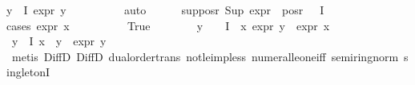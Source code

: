 \begin{isabellebody}
{\isachardoublequoteopen}{\isasymforall}y{\isasymin}{\isasymPhi}\ {\isacharbackquote}{\kern0pt}\ I{\isachardot}{\kern0pt}\ expr{\isacharunderscore}{\kern0pt}{}\ y\ {\isasymle}\ {}{\isachardoublequoteclose}\isanewline
\ \ \ \ \ \ \isamarkupfalse%
\ auto\isanewline
\ \ \ \ \isamarkupfalse%
\ sup{\isacharunderscore}{\kern0pt}pos{\isacharunderscore}{\kern0pt}r{\isacharcolon}{\kern0pt}\ {\isachardoublequoteopen}Sup\ {\isacharparenleft}{\kern0pt}expr{\isacharunderscore}{\kern0pt}{}\ {\isacharbackquote}{\kern0pt}\ {\isacharparenleft}{\kern0pt}pos{\isacharunderscore}{\kern0pt}r\ {\isacharparenleft}{\kern0pt}{\isasymPhi}\ {\isacharbackquote}{\kern0pt}\ I{\isacharparenright}{\kern0pt}{\isacharparenright}{\kern0pt}{\isacharparenright}{\kern0pt}\ {\isasymle}\ {}{\isachardoublequoteclose}\isanewline
\ \ \ \ \isamarkupfalse%
{\isacharparenleft}{\kern0pt}cases\ {\isachardoublequoteopen}expr{\isacharunderscore}{\kern0pt}{}\ x\ {\isasymge}\ {}{\isachardoublequoteclose}{\isacharparenright}{\kern0pt}\isanewline
\ \ \ \ \ \ \isamarkupfalse%
\ True\isanewline
\ \ \ \ \ \ \isamarkupfalse%
\ {\isachardoublequoteopen}{\isasymforall}y\ {\isasymin}\ {\isacharparenleft}{\kern0pt}{\isasymPhi}\ {\isacharbackquote}{\kern0pt}\ I{\isacharparenright}{\kern0pt}\ {\isacharminus}{\kern0pt}\ {\isacharbraceleft}{\kern0pt}x{\isacharbraceright}{\kern0pt}{\isachardot}{\kern0pt}\ expr{\isacharunderscore}{\kern0pt}{}\ y\ {\isacharless}{\kern0pt}\ expr{\isacharunderscore}{\kern0pt}{}\ x{\isachardoublequoteclose}\isanewline
\ \ \ \ \ \ \ \ \isamarkupfalse%
\ {\isacartoucheopen}{\isasymforall}y{\isasymin}{\isasymPhi}\ {\isacharbackquote}{\kern0pt}\ I{\isachardot}{\kern0pt}\ x\ {\isasymnoteq}\ y\ {\isasymlongrightarrow}\ expr{\isacharunderscore}{\kern0pt}{}\ y\ {\isasymle}\ {}{\isacartoucheclose}\isanewline
\ \ \ \ \ \ \ \ \isamarkupfalse%
\ {\isacharparenleft}{\kern0pt}metis\ DiffD{}\ DiffD{}\ dual{\isacharunderscore}{\kern0pt}order{\isachardot}{\kern0pt}trans\ not{\isacharunderscore}{\kern0pt}le{\isacharunderscore}{\kern0pt}imp{\isacharunderscore}{\kern0pt}less\ numeral{\isacharunderscore}{\kern0pt}le{\isacharunderscore}{\kern0pt}one{\isacharunderscore}{\kern0pt}iff\ semiring{\isacharunderscore}{\kern0pt}norm{\isacharparenleft}{\kern0pt}{}{}{\isacharparenright}{\kern0pt}\ singletonI{\isacharparenright}{\kern0pt}\isanewline

\end{isabellebody}
